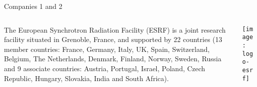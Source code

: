 \documentclass[../main/main.tex]{subfiles}
\begin{document}
\onlyinsubfile{%

}

\begin{frame}[t]{Companies 1 and 2}
    \begin{columns}[c]
        \begin{column}{0.6\textwidth}
The European Synchrotron Radiation Facility (ESRF) is a joint research facility situated in Grenoble, France, and supported by 22 countries (13 member countries: France, Germany, Italy, UK, Spain, Switzerland, Belgium, The Netherlands, Denmark, Finland, Norway, Sweden, Russia and 9 associate countries: Austria, Portugal, Israel, Poland, Czech Republic, Hungary, Slovakia, India and South Africa).
        \end{column}
        \begin{column}{0.4\textwidth}
            \centering
            \texttt{[image: logo-esrf]}
        \end{column}
    \end{columns}
\end{frame}
\end{document}
